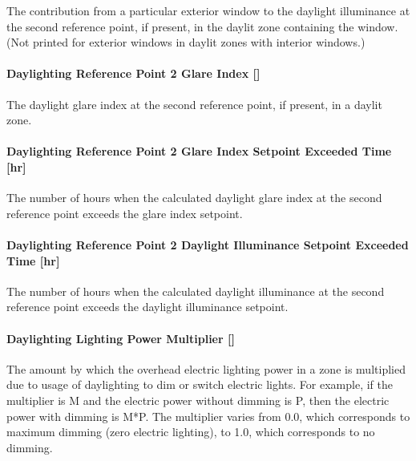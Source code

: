 The contribution from a particular exterior window to the daylight illuminance at the second reference point, if present, in the daylit zone containing the window. (Not printed for exterior windows in daylit zones with interior windows.)

\paragraph{\texorpdfstring{Daylighting Reference Point 2 Glare Index {[]}}{Daylighting Reference Point 2 Glare Index }}\label{daylighting-reference-point-2-glare-index}

The daylight glare index at the second reference point, if present, in a daylit zone.

\paragraph{Daylighting Reference Point 2 Glare Index Setpoint Exceeded Time {[}hr{]}}\label{daylighting-reference-point-2-glare-index-setpoint-exceeded-time-hr}

The number of hours when the calculated daylight glare index at the second reference point exceeds the glare index setpoint.

\paragraph{Daylighting Reference Point 2 Daylight Illuminance Setpoint Exceeded Time {[}hr{]}}\label{daylighting-reference-point-2-daylight-illuminance-setpoint-exceeded-time-hr}

The number of hours when the calculated daylight illuminance at the second reference point exceeds the daylight illuminance setpoint.

\paragraph{\texorpdfstring{Daylighting Lighting Power Multiplier {[]}}{Daylighting Lighting Power Multiplier }}\label{daylighting-lighting-power-multiplier-1}

The amount by which the overhead electric lighting power in a zone is multiplied due to usage of daylighting to dim or switch electric lights. For example, if the multiplier is M and the electric power without dimming is P, then the electric power with dimming is M*P. The multiplier varies from 0.0, which corresponds to maximum dimming (zero electric lighting), to 1.0, which corresponds to no dimming.

